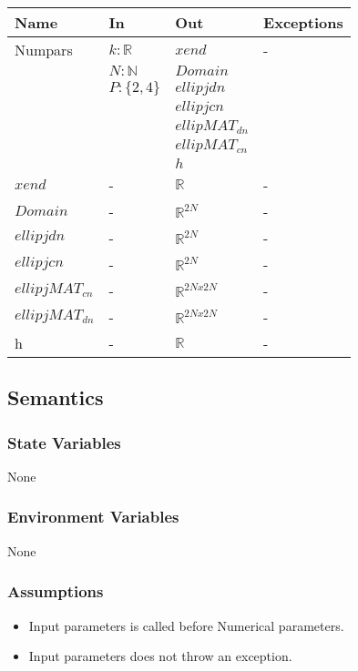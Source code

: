 \documentclass[12pt, titlepage]{article}
\begin{document}
\begin{center}
	\begin{tabular}{p{3cm} p{3cm} p{7cm} >{\raggedright\arraybackslash}p{3cm}}
		\toprule
		\textbf{Name} & \textbf{In} & \textbf{Out} & \textbf{Exceptions} \\
		\hline
		Numpars & $k :\mathbb{R}$ & 
		$xend$ & - \\ 
		  &$N: \mathbb{N}$ & $Domain$ &  \\
		  &$P:\{2,4\}$  & $ellipjdn$ &  \\ 
		  &  & $ellipjcn$ &  \\ 
		  &  & $ellipMAT_{dn}$ &  \\
		  &  & $ellipMAT_{cn}$ &  \\ 
		   &  & $h$ &  \\
		$xend$ & - & $\mathbb{R}$ & - \\
		$Domain$ & - & $\mathbb{R}^{2N}$ &- \\
		$ellipjdn$ & - & $\mathbb{R}^{2N}$ &- \\
		$ellipjcn$ & - & $\mathbb{R}^{2N}$ &- \\
		$ellipjMAT_{cn}$ & - & $\mathbb{R}^{2Nx2N}$ &- \\
		$ellipjMAT_{dn}$ & - & $\mathbb{R}^{2Nx2N}$ &- \\
		h & - & $\mathbb{R}$ & -\\ 
		\hline
	\end{tabular}
\end{center}

\subsection{Semantics}

\subsubsection{State Variables}
None

\subsubsection{Environment Variables}

None

\subsubsection{Assumptions}

\begin{itemize}
	\item Input parameters is called before Numerical parameters. 
	\item Input parameters does not throw an exception. 
\end{itemize}
\end{document}
